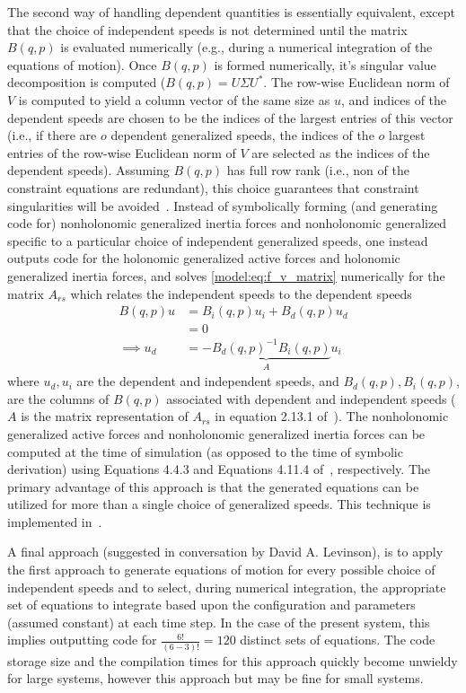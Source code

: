 The second way of handling dependent quantities is essentially equivalent,
except that the choice of independent speeds is not determined until the matrix
$B(q,p)$ is evaluated numerically (e.g., during a numerical integration of the
equations of motion). Once $B(q, p)$ is formed numerically, it's singular value
decomposition is computed ($B(q, p) = U\Sigma U^*$. The row-wise Euclidean norm
of $V$ is computed to yield a column vector of the same size as $u$, and
indices of the dependent speeds are chosen to be the indices of the largest
entries of this vector (i.e., if there are $o$ dependent generalized speeds,
the indices of the $o$ largest entries of the row-wise Euclidean norm of $V$
are selected as the indices of the dependent speeds). Assuming $B(q, p)$ has
full row rank (i.e., non of the constraint equations are redundant), this
choice guarantees that constraint singularities will be
avoided~\cite{Reckdahl1996}. Instead of symbolically forming (and generating
code for) nonholonomic generalized inertia forces and nonholonomic generalized
specific to a particular choice of independent generalized speeds, one instead
outputs code for the holonomic generalized active forces and holonomic
generalized inertia forces, and solves \autoref{model:eq:f_v_matrix}
numerically for the matrix $A_{rs}$ which relates the independent speeds to the
dependent speeds
\begin{align}
  B(q, p) u &= B_i(q, p) u_i + B_d(q, p) u_d \\
            &= 0 \\
\implies u_d &= \underbrace{-B_d(q, p)^{-1} B_i(q, p)}_{A} u_i
\end{align}
where $u_d, u_i$ are the dependent and independent speeds, and $B_d(q,p),
B_i(q,p)$, are the columns of $B(q, p)$ associated with dependent and
independent speeds ($A$ is the matrix representation of $A_{rs}$ in equation
2.13.1 of~\cite{Kane1985}). The nonholonomic generalized active forces and
nonholonomic generalized inertia forces can be computed at the time of
simulation (as opposed to the time of symbolic derivation) using Equations
4.4.3 and Equations 4.11.4 of~\cite{Kane1985}, respectively. The primary
advantage of this approach is that the generated equations can be utilized for
more than a single choice of generalized speeds. This technique is implemented
in~\cite{libbicycle}.

A final approach (suggested in conversation by David A. Levinson), is to apply
the first approach to generate equations of motion for every possible choice of
independent speeds and to select, during numerical integration, the appropriate
set of equations to integrate based upon the configuration and parameters
(assumed constant) at each time step. In the case of the present system, this
implies outputting code for $\frac{6!}{(6-3)!}=120$ distinct sets of equations.
The code storage size and the compilation times for this approach quickly
become unwieldy for large systems, however this approach but may be fine for
small systems.


